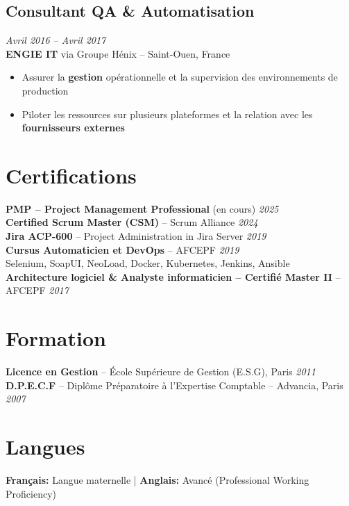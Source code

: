 \documentclass[11pt,a4paper]{article}
\newcommand{\highlight}[1]{\textbf{#1}}
\begin{document}
\subsection*{Consultant QA \& Automatisation} \hfill \textit{Avril 2016 -- Avril 2017}\\
\textbf{ENGIE IT} via Groupe H\'{e}nix -- Saint-Ouen, France
\begin{itemize}
    \item Assurer la \highlight{gestion} op\'{e}rationnelle et la supervision des environnements de production
    \item Piloter les ressources sur plusieurs plateformes et la relation avec les \highlight{fournisseurs externes}
\end{itemize}

\section*{Certifications}

\textbf{PMP -- Project Management Professional} (en cours) \hfill \textit{2025}\\
\textbf{Certified Scrum Master (CSM)} -- Scrum Alliance \hfill \textit{2024}\\
\textbf{Jira ACP-600} -- Project Administration in Jira Server \hfill \textit{2019}\\
\textbf{Cursus Automaticien et DevOps} -- AFCEPF \hfill \textit{2019}\\
Selenium, SoapUI, NeoLoad, Docker, Kubernetes, Jenkins, Ansible\\
\textbf{Architecture logiciel \& Analyste informaticien -- Certifi\'{e} Master II} -- AFCEPF \hfill \textit{2017}

\section*{Formation}

\textbf{Licence en Gestion} -- \'{E}cole Sup\'{e}rieure de Gestion (E.S.G), Paris \hfill \textit{2011}\\
\textbf{D.P.E.C.F} -- Dipl\^{o}me Pr\'{e}paratoire \`{a} l'Expertise Comptable -- Advancia, Paris \hfill \textit{2007}

\section*{Langues}

\textbf{Fran\c{c}ais:} Langue maternelle \quad | \quad \textbf{Anglais:} Avanc\'{e} (Professional Working Proficiency)
\end{document}

